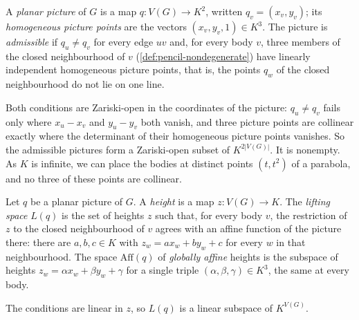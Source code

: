 \begin{definition}
  \label{def:pencil-admissible-picture}
  \leanok
  A \emph{planar picture} of $G$ is a map $q \colon V(G) \to K^2$,
  written $q_v = (x_v, y_v)$; its \emph{homogeneous picture points} are
  the vectors $(x_v, y_v, 1) \in K^3$. The picture is \emph{admissible}
  if $q_u \neq q_v$ for every edge $uv$ and, for every body $v$, three
  members of the closed neighbourhood of $v$
  (\cref{def:pencil-nondegenerate}) have linearly independent homogeneous
  picture points, that is, the points $q_w$ of the closed neighbourhood
  do not lie on one line.
\end{definition}

Both conditions are Zariski-open in the coordinates of the picture:
$q_u \neq q_v$ fails only where $x_u - x_v$ and $y_u - y_v$ both vanish,
and three picture points are collinear exactly where the determinant of
their homogeneous picture points vanishes. So the admissible pictures
form a Zariski-open subset of $K^{2|V(G)|}$. It is nonempty. As $K$ is
infinite, we can place the bodies at distinct points $(t, t^2)$ of a
parabola, and no three of these points are collinear.

\begin{definition}
  \label{def:pencil-lifting-space}
  \leanok
  Let $q$ be a planar picture of $G$. A \emph{height} is a map
  $z \colon V(G) \to K$. The \emph{lifting space} $L(q)$ is the set of
  heights $z$ such that, for every body $v$, the restriction of $z$ to
  the closed neighbourhood of $v$ agrees with an affine function of the
  picture there: there are $a, b, c \in K$ with
  $z_w = a x_w + b y_w + c$ for every $w$ in that neighbourhood. The
  space $\mathrm{Aff}(q)$ of \emph{globally affine} heights is the
  subspace of heights $z_w = \alpha x_w + \beta y_w + \gamma$ for a
  single triple $(\alpha, \beta, \gamma) \in K^3$, the same at every
  body.
\end{definition}

The conditions are linear in $z$, so $L(q)$ is a linear subspace of
$K^{V(G)}$.


